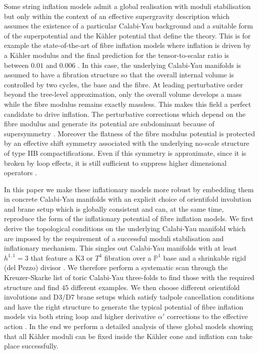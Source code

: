 \documentclass[11pt,a4paper]{article}
\newcommand{\mbb}{\mathbb}
\begin{document}
Some string inflation models admit a global realisation with moduli stabilisation but only within the context of an effective supergravity description which assumes the existence of a particular Calabi-Yau background and a suitable form of the superpotential and the K\"ahler potential that define the theory. This is for example the state-of-the-art of fibre inflation models \cite{Burgess:2016owb} where inflation is driven by a K\"ahler modulus and the final prediction for the tensor-to-scalar ratio is between $0.01$ \cite{Cicoli:2016chb} and $0.006$ \cite{Cicoli:2008gp}. In this case, the underlying Calabi-Yau manifolds is assumed to have a fibration structure so that the overall internal volume is controlled by two cycles, the base and the fibre. At leading perturbative order beyond the tree-level approximation, only the overall volume develops a mass while the fibre modulus remains exactly massless. This makes this field a perfect candidate to drive inflation. The perturbative corrections which depend on the fibre modulus and generate its potential are subdominant because of supersymmetry \cite{Cicoli:2007xp}. Moreover the flatness of the fibre modulus potential is protected by an effective shift symmetry associated with the underlying no-scale structure of type IIB compactifications. Even if this symmetry is approximate, since it is broken by loop effects, it is still sufficient to suppress higher dimensional operators \cite{Burgess:2014tja}. 

In this paper we make these inflationary models more robust by embedding them in concrete Calabi-Yau manifolds with an explicit choice of orientifold involution and brane setup which is globally consistent and can, at the same time, reproduce the form of the inflationary potential of fibre inflation models. 
We first derive the topological conditions on the underlying Calabi-Yau manifold which are imposed by the requirement of a successful moduli stabilisation and inflationary mechanism. This singles out Calabi-Yau manifolds with at least $h^{1,1}=3$ that feature a K3 or $T^4$ fibration over a $\mbb{P}^1$ base and a shrinkable rigid (del Pezzo) divisor \cite{Cicoli:2008va, Cicoli:2011it}. We therefore perform a systematic scan through the Kreuzer-Skarke list of toric Calabi-Yau three-folds \cite{Kreuzer:2000xy} to find those with the required structure and find $45$ different examples. We then choose different orientifold involutions and D3/D7 brane setups which satisfy tadpole cancellation conditions and have the right structure to generate the typical potential of fibre inflation models via both string loop \cite{Berg:2005ja, Berg:2007wt, Cicoli:2007xp} and higher derivative $\alpha'$ corrections to the effective action \cite{Ciupke:2015msa}. In the end we perform a detailed analysis of these global models showing that all K\"ahler moduli can be fixed inside the K\"ahler cone and inflation can take place successfully. 
\end{document}
